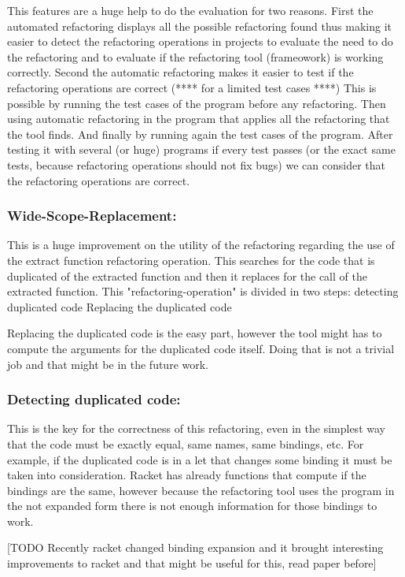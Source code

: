 This features are a huge help to do the evaluation for two reasons.
First the automated refactoring displays all the possible refactoring found thus making it easier
to detect the refactoring operations in projects to evaluate the need to do the refactoring and to evaluate
if the refactoring tool (frameowork) is working correctly.
Second the automatic refactoring makes it easier to test if the refactoring operations are correct (**** for a limited test cases ****)
This is possible by running the test cases of the program before any refactoring.
Then using automatic refactoring in the program that applies all the refactoring that the tool finds.
And finally by running again the test cases of the program.
After testing it with several (or huge) programs if every test passes (or the exact same tests, because refactoring operations should not fix bugs)
we can consider that the refactoring operations are correct.


\subsubsection{Wide-Scope-Replacement:}
This is a huge improvement on the utility of the refactoring regarding the use
of the extract function refactoring operation. This searches for the code that is
duplicated of the extracted function and then it replaces for the call of the
extracted function.
This "refactoring-operation" is divided in two steps:
detecting duplicated code
Replacing the duplicated code

Replacing the duplicated code is the easy part, however the tool might has to compute
the arguments for the duplicated code itself. Doing that is not a trivial job and
that might be in the future work.

\subsubsection{Detecting duplicated code:}
This is the key for the correctness of this refactoring, even in the simplest way
that the code must be exactly equal, same names, same bindings, etc.
For example, if the duplicated code is in a let that changes some binding it must
be taken into consideration. Racket has already functions that compute if the bindings
are the same, however because the refactoring tool uses the program in the not expanded
form there is not enough information for those bindings to work.

[TODO Recently racket changed binding expansion and it brought interesting improvements
to racket and that might be useful for this, read paper before]


